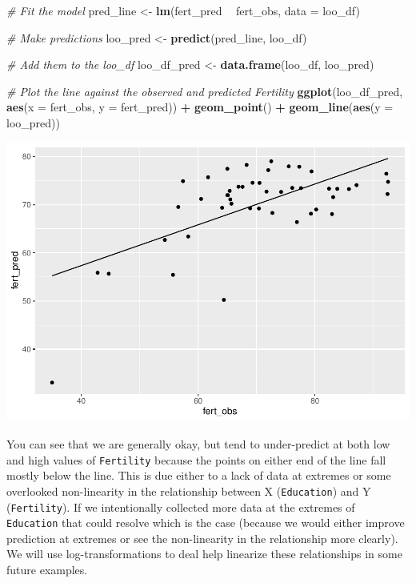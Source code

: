 \documentclass[
]{book}
\newenvironment{Shaded}{\begin{snugshade}}{\end{snugshade}}
\newcommand{\CommentTok}[1]{\textcolor[rgb]{0.56,0.35,0.01}{\textit{#1}}}
\newcommand{\DataTypeTok}[1]{\textcolor[rgb]{0.13,0.29,0.53}{#1}}
\newcommand{\KeywordTok}[1]{\textcolor[rgb]{0.13,0.29,0.53}{\textbf{#1}}}
\newcommand{\NormalTok}[1]{#1}
\newcommand{\OperatorTok}[1]{\textcolor[rgb]{0.81,0.36,0.00}{\textbf{#1}}}
\newcommand{\StringTok}[1]{\textcolor[rgb]{0.31,0.60,0.02}{#1}}
\begin{document}
\begin{Shaded}
\begin{Highlighting}[]
\CommentTok{# Fit the model}
\NormalTok{pred_line <-}\StringTok{ }\KeywordTok{lm}\NormalTok{(fert_pred }\OperatorTok{~}\StringTok{ }\NormalTok{fert_obs, }\DataTypeTok{data =}\NormalTok{ loo_df)}

\CommentTok{# Make predictions}
\NormalTok{loo_pred <-}\StringTok{ }\KeywordTok{predict}\NormalTok{(pred_line, loo_df)}

\CommentTok{# Add them to the loo_df}
\NormalTok{loo_df_pred <-}\StringTok{ }\KeywordTok{data.frame}\NormalTok{(loo_df, loo_pred)}

\CommentTok{# Plot the line against the observed and predicted Fertility}
\KeywordTok{ggplot}\NormalTok{(loo_df_pred, }\KeywordTok{aes}\NormalTok{(}\DataTypeTok{x =}\NormalTok{ fert_obs, }\DataTypeTok{y =}\NormalTok{ fert_pred)) }\OperatorTok{+}
\StringTok{  }\KeywordTok{geom_point}\NormalTok{() }\OperatorTok{+}
\StringTok{  }\KeywordTok{geom_line}\NormalTok{(}\KeywordTok{aes}\NormalTok{(}\DataTypeTok{y =}\NormalTok{ loo_pred))}
\end{Highlighting}
\end{Shaded}

\includegraphics{worstr_files/figure-latex/unnamed-chunk-315-1.pdf}

You can see that we are generally okay, but tend to under-predict at both low and high values of \texttt{Fertility} because the points on either end of the line fall mostly below the line. This is due either to a lack of data at extremes or some overlooked non-linearity in the relationship between X (\texttt{Education}) and Y (\texttt{Fertility}). If we intentionally collected more data at the extremes of \texttt{Education} that could resolve which is the case (because we would either improve prediction at extremes or see the non-linearity in the relationship more clearly). We will use log-transformations to deal help linearize these relationships in some future examples.
\end{document}
